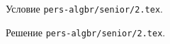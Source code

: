 \problem
Условие \texttt{pers-algbr/senior/2.tex}.

\solution Решение \texttt{pers-algbr/senior/2.tex}.
\endproblem
